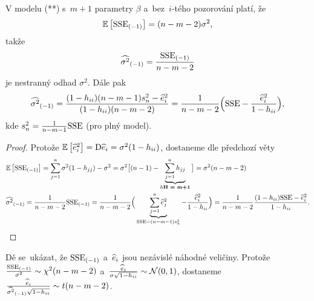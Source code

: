 \begin{dusl}
	V modelu (**) s~$m+1$ parametry $\beta$ a~bez~$i$-tého pozorování platí, že $$ \mathbb{E}\left[ {\mathrm{SSE}_{(-1)}} \right] = (n-m-2)\sigma^2, $$
	takže
	 $$ {\widehat{{\sigma}^2}_{(-1)}} = \frac{{\mathrm{SSE}_{(-1)}}}{n-m-2} $$ je nestranný odhad $\sigma^2$. Dále pak
	 $$ {\widehat{{\sigma}^2}_{(-1)}} = \frac{(1-h_{ii})(n-m-1)s_n^2-\widehat{e}_i^2}{(1-h_{ii})(n-m-2)} = \frac{1}{n-m-2}\Big(\mathrm{SSE} -\frac{\widehat{e}_i^2}{1-h_{ii}}\Big), $$ kde $s_n^2 = \frac{1}{n-m-1}\mathrm{SSE}$ (pro plný model).
	\begin{proof}
		Protože $\mathbb{E}\left[ \widehat{e}_i^2 \right] = \mathrm{D} \widehat{e}_i = \sigma^2(1-h_{ii})$, dostaneme dle předchozí věty
		\[
		\begin{split}
		&\mathbb{E}\left[ {\mathrm{SSE}_{(-1)}} \right] = \sum\limits_{j=1}^{n}\sigma^2(1-h_{jj})-\sigma^2 = \sigma^2\big[(n-1)-\underbrace{\sum\limits_{j=1}^{n} h_{jj}}_{h\textbf{H = m+1}}\big] = \sigma^2(n-m-2)\\
		&{\widehat{{\sigma}^2}_{(-1)}} = \frac{1}{n-m-2}{\mathrm{SSE}_{(-1)}} = \frac{1}{n-m-2}\Big(\underbrace{\sum\limits_{j=1}^{n}\widehat{e}_j^2}_{\mathrm{SSE} = (n-m-1)s_n^2}-\frac{\widehat{e}_i^2}{1-h_{ii}}\Big) = \frac{1}{n-m-2}\frac{(1-h_{ii})\mathrm{SSE}-\widehat{e}_i^2}{1-h_{ii}}.
		\end{split}
		\]
	\end{proof}
\end{dusl}

\begin{remark}
	Dě se~ukázat, že ${\mathrm{SSE}_{(-1)}}$ a~$\widehat{e}_i$ jsou nezávislé náhodné veličiny. Protože $\frac{{\mathrm{SSE}_{(-1)}}}{\sigma^2}\sim\chi^2(n-m-2)$ a~$\frac{\widehat{e}_i}{\sigma\sqrt{1-h_{ii}}}\sim\mathcal{N}(0,1)$, dostaneme $\frac{\widehat{e}_i}{{\widehat{{\sigma}^2}_{(-1)}}\sqrt{1-h_{ii}}}\sim t(n-m-2)$.
\end{remark}

